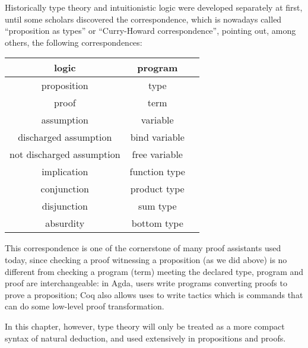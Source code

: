 \documentclass[../../../include/open-logic-section]{subfiles}
\begin{document}
Historically type theory and intuitionistic logic were developed
separately at first, until some scholars discovered the
correspondence, which is nowadays called ``proposition as types'' or
``Curry-Howard correspondence'', pointing out, among others, the following
correspondences:
\begin{center}
  \begin{tabular}{c c c}
    logic & program \\
    \hline
    proposition & type \\
    proof & term \\
    assumption & variable \\
    discharged assumption & bind variable \\
    not discharged assumption & free variable \\
    implication & function type \\
    conjunction & product type \\
    disjunction & sum type \\
    absurdity & bottom type \\
    \hline
  \end{tabular}
\end{center}

This correspondence is one of the cornerstone of many proof assistants
used today, since checking a proof witnessing a proposition (as we did above) is no different from checking a
program (term) meeting the declared type, program and proof are interchangeable: in Agda, users
write programs converting proofs to prove a proposition; Coq also allows uses to write tactics
which is commands that can do some low-level proof transformation.

In this chapter, however, type theory will only be treated as a more
compact syntax of natural deduction, and used extensively in
propositions and proofs.
\end{document}
